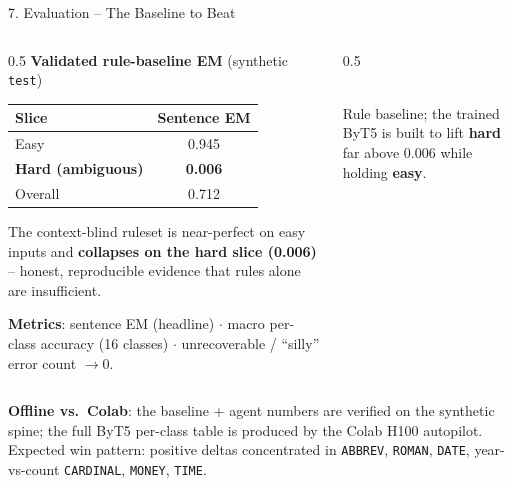 \documentclass[10pt,aspectratio=169]{beamer}
\begin{document}
\begin{frame}{7. Evaluation -- The Baseline to Beat}
\begin{columns}[T]
\begin{column}{0.5\textwidth}
\textbf{Validated rule-baseline EM} (synthetic \texttt{test})
\begin{table}[h]
\centering\small
\begin{tabular}{lc}
\toprule
\textbf{Slice} & \textbf{Sentence EM} \\
\midrule
Easy & 0.945 \\
\textbf{Hard (ambiguous)} & \textbf{0.006} \\
Overall & 0.712 \\
\bottomrule
\end{tabular}
\end{table}
\small The context-blind ruleset is near-perfect on easy inputs and \textbf{collapses on the hard slice (0.006)} -- honest, reproducible evidence that rules alone are insufficient.

\vspace{0.1cm}
\textbf{Metrics}: sentence EM (headline) $\cdot$ macro per-class accuracy (16 classes) $\cdot$ unrecoverable / ``silly'' error count $\rightarrow$0.
\end{column}
\begin{column}{0.5\textwidth}
\centering
{}\\
\tiny Rule baseline; the trained ByT5 is built to lift \textbf{hard} far above 0.006 while holding \textbf{easy}.
\end{column}
\end{columns}

\vspace{0.1cm}
\scriptsize \textbf{Offline vs.\ Colab}: the baseline + agent numbers are verified on the synthetic spine; the full ByT5 per-class table is produced by the Colab H100 autopilot. Expected win pattern: positive deltas concentrated in \texttt{ABBREV}, \texttt{ROMAN}, \texttt{DATE}, year-vs-count \texttt{CARDINAL}, \texttt{MONEY}, \texttt{TIME}.
\end{frame}
\end{document}
